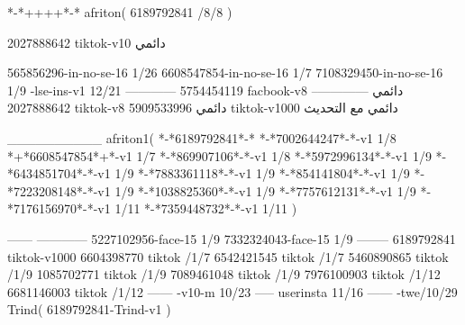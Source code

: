 *-*++++*-*
afriton(
6189792841 /8/8
)

2027888642 tiktok-v10
دائمي

565856296-in-no-se-16 1/26
6608547854-in-no-se-16 1/7
7108329450-in-no-se-16 1/9
-lse-ins-v1 12/21
------------
5754454119 facbook-v8
دائمي
--------------
2027888642 tiktok-v8
دائمي
5909533996 tiktok-v1000
دائمي مع التحديث

__________
afriton1(
*-*6189792841*-*
*-*7002644247*-*-v1 1/8
*+*6608547854*+*-v1 1/7
*-*869907106*-*-v1 1/8
*-*5972996134*-*-v1 1/9
*-*6434851704*-*-v1 1/9
*-*7883361118*-*-v1 1/9
*-*854141804*-*-v1 1/9
*-*7223208148*-*-v1 1/9
*-*1038825360*-*-v1 1/9
*-*7757612131*-*-v1 1/9
*-*7176156970*-*-v1 1/11
*-*7359448732*-*-v1 1/11
)

------
------------
5227102956-face-15 1/9
7332324043-face-15 1/9
--------
6189792841 tiktok-v1000
6604398770 tiktok /1/7
6542421545 tiktok /1/7
5460890865 tiktok /1/9
1085702771 tiktok /1/9
7089461048 tiktok /1/9
7976100903 tiktok /1/12
6681146003 tiktok /1/12
------
-v10-m 10/23
-----
userinsta 11/16
------
-twe/10/29
Trind(
6189792841-Trind-v1 
)
